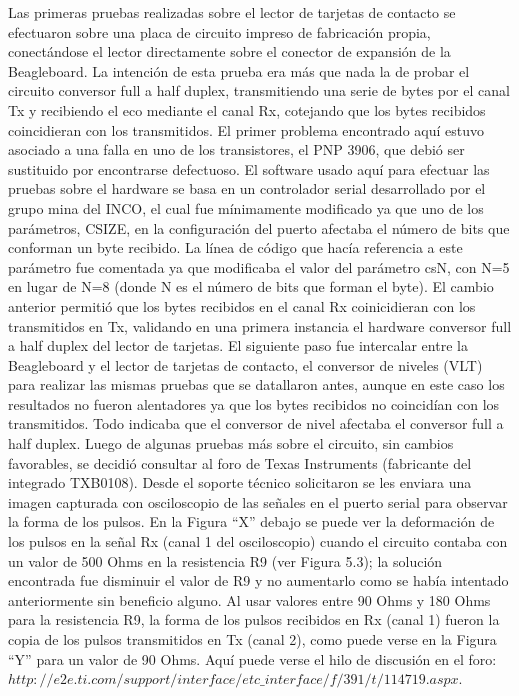 Las primeras pruebas realizadas sobre el lector de tarjetas de contacto se efectuaron sobre una
placa de circuito impreso de fabricación propia, conectándose el lector directamente sobre el 
conector de expansión de la Beagleboard. La intención de esta prueba era más que nada la de probar
el circuito conversor full a half duplex, transmitiendo una serie de bytes por el canal Tx y recibiendo
el eco mediante el canal Rx, cotejando que los bytes recibidos coincidieran con los transmitidos. 
El primer problema encontrado aquí estuvo asociado a una falla en uno de los transistores, el PNP 3906, 
que debió ser sustituido por encontrarse defectuoso.
El software usado aquí para efectuar las pruebas sobre el hardware se basa en un controlador serial 
desarrollado por el grupo mina del INCO, el cual fue mínimamente modificado ya que uno de los 
parámetros, CSIZE, en la configuración del puerto afectaba el número de bits que conforman un byte recibido. 
La línea de código que hacía referencia a este parámetro fue comentada ya que modificaba el valor del parámetro 
csN, con N=5 en lugar de N=8 (donde N es el número de bits que forman el byte). 
El cambio anterior permitió que los bytes recibidos en el canal Rx coinicidieran con los transmitidos en Tx, 
validando en una primera instancia el hardware conversor full a half duplex del lector de tarjetas.
El siguiente paso fue intercalar entre la Beagleboard y el lector de tarjetas de contacto, el conversor de niveles (VLT) para realizar las mismas pruebas que se datallaron antes, aunque en este caso los resultados no fueron alentadores ya que los bytes recibidos no coincidían con los transmitidos. Todo indicaba que el conversor de nivel afectaba el conversor full a half duplex. Luego de algunas pruebas más sobre el circuito, sin cambios favorables, se decidió consultar al foro de Texas Instruments (fabricante del integrado TXB0108). Desde el soporte técnico solicitaron se les enviara una imagen capturada con osciloscopio de las señales en el puerto serial para observar la forma de los pulsos. En la Figura “X” debajo se puede ver la deformación de los pulsos en la señal Rx (canal 1 del osciloscopio) cuando el circuito contaba con un valor de 500 Ohms en la resistencia R9 (ver Figura 5.3); la solución encontrada fue disminuir el valor de R9 y no aumentarlo como se había intentado anteriormente sin beneficio alguno. Al usar valores entre 90 Ohms y 180 Ohms para la resistencia R9, la forma de los pulsos recibidos en Rx (canal 1) fueron la copia de los pulsos transmitidos en Tx (canal 2), como puede verse en la Figura “Y” para un valor de 90 Ohms. 
Aquí puede verse el hilo de discusión en el foro: ${http://e2e.ti.com/support/interface/etc\_interface/f/391/t/114719.aspx}$.

